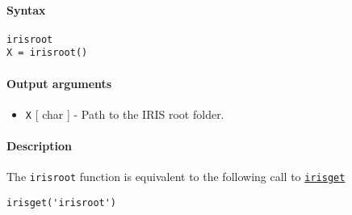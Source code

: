 


	\paragraph{Syntax}

\begin{verbatim}
irisroot
X = irisroot()
\end{verbatim}

\paragraph{Output arguments}

\begin{itemize}
\itemsep1pt\parskip0pt
\item
  \texttt{X} {[} char {]} - Path to the IRIS root folder.
\end{itemize}

\paragraph{Description}

The \texttt{irisroot} function is equivalent to the following call to
\href{config/irisget}{\texttt{irisget}}

\begin{verbatim}
irisget('irisroot')
\end{verbatim}


